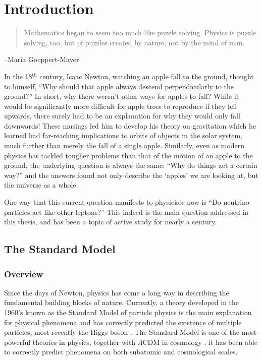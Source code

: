\chapter{Introduction}
\begin{quote}
Mathematics began to seem too much like puzzle solving. Physics is puzzle solving, too, but of puzzles created by nature, not by the mind of man.
\end{quote}
\begin{flushright}
--Maria Goeppert-Mayer
\end{flushright}

In the 18$^\textrm{th}$ century, Isaac Newton,  watching an apple fall to the ground, thought to himself, ``Why should that apple always descend perpendicularly to the ground?'' In short, why there weren't other ways for apples to fall? While it would be significantly more difficult for apple trees to reproduce if they fell upwards, there surely had to be an explanation for why they would only fall downwards! These musings led him to develop his theory on gravitation which he learned had far-reaching implications to orbits of objects in the solar system, much further than merely the fall of a single apple. Similarly, even as modern physics has tackled tougher problems than that of the motion of an apple to the ground, the underlying question is always the same: ``Why do things act a certain way?'' and the answers found not only describe the `apples' we are looking at, but the universe as a whole.

One way that this current question manifests to physicists now is ``Do neutrino particles act like other leptons?'' This indeed is the main question addressed in this thesis, and has been a topic of active study for nearly a century.

\section{The Standard Model}
\subsection{Overview}

Since the days of Newton, physics has come a long way in describing the fundamental building blocks of nature. Currently, a theory developed in the 1960's known as the Standard Model of particle physics is the main explanation for physical phenomena and has correctly predicted the existence of multiple particles, most recently the Higgs boson \cite{Aad:2012tfa}\cite{Chatrchyan:2012xdj}. The Standard Model is one of the most powerful theories in physics, together with $\Lambda$CDM in cosmology , it has been able to correctly predict phenomena on both subatomic and cosmological scales.

